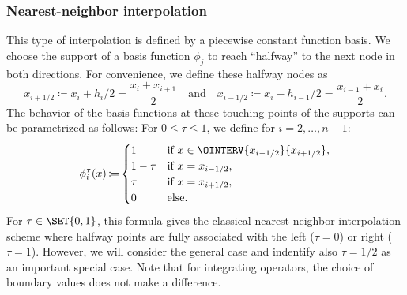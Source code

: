 \documentclass[a4paper]{paper}
\DeclareMathOperator{\DEFEQ}{{\coloneqq}}
\begin{document}
\subsubsection{Nearest-neighbor interpolation}
\label{subsubsec:specif:interp:nn}

This type of interpolation is defined by a piecewise constant function basis. We choose the support of a basis function 
$\phi_j$ to reach ``halfway'' to the next node in both directions. For convenience, we define these halfway nodes as
%
\begin{equation*}
 x_{i+1/2} \DEFEQ x_i + h_i /2 = \frac{x_i + x_{i+1}}{2} \quad \text{and} \quad 
 x_{i-1/2} \DEFEQ x_i - h_{i-1} /2 = \frac{x_{i-1} + x_i}{2}.
\end{equation*}
%
The behavior of the basis functions at these touching points of the supports can be parametrized as follows: For 
$0 \leq \tau \leq 1$, we define for $i = 2, \dots, n-1$:
%
\begin{equation*}
 \phi_i^\tau(x) \DEFEQ 
 \begin{cases}
  1 & \text{if } x \in \OINTERV{x_{i-1/2}}{x_{i+1/2}}, \\
  1 - \tau & \text{if } x = x_{i-1/2}, \\
  \tau & \text{if } x = x_{i+1/2}, \\
  0 & \text{else}.
 \end{cases}
\end{equation*}
%
For $\tau \in \SET{0, 1}$, this formula gives the classical nearest neighbor interpolation scheme where halfway points 
are fully associated with the left ($\tau = 0$) or right ($\tau = 1$). However, we will consider the general case and 
indentify also $\tau = 1/2$ as an important special case. Note that for integrating operators, the choice of boundary 
values does not make a difference.
\end{document}
